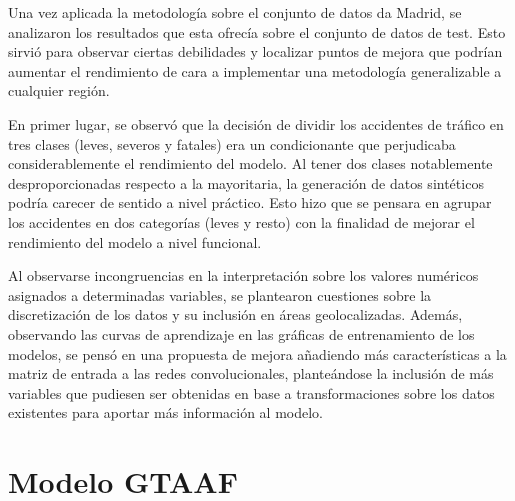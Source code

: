 \documentclass{uathesis-es}
\begin{document}

Una vez aplicada la metodología sobre el conjunto de datos da Madrid, se analizaron los resultados que esta ofrecía sobre el conjunto de datos de test. Esto sirvió para observar ciertas debilidades y localizar puntos de mejora que podrían aumentar el rendimiento de cara a implementar una metodología generalizable a cualquier región.

En primer lugar, se observó que la decisión de dividir los accidentes de tráfico en tres clases (leves, severos y fatales) era un condicionante que perjudicaba considerablemente el rendimiento del modelo. Al tener dos clases notablemente desproporcionadas respecto a la mayoritaria, la generación de datos sintéticos podría carecer de sentido a nivel práctico. Esto hizo que se pensara en agrupar los accidentes en dos categorías (leves y resto) con la finalidad de mejorar el rendimiento del modelo a nivel funcional.


Al observarse incongruencias en la interpretación sobre los valores numéricos asignados a determinadas variables, se plantearon cuestiones sobre la discretización de los datos y su inclusión en áreas geolocalizadas. Además, observando las curvas de aprendizaje en las gráficas de entrenamiento de los modelos, se pensó en una propuesta de mejora añadiendo más características a la matriz de entrada a las redes convolucionales, planteándose la inclusión de más variables que pudiesen ser obtenidas en base a transformaciones sobre los datos existentes para aportar más información al modelo.

\section{Modelo GTAAF}
\label{METODOLOGIA_GTAAF}

\end{document}
